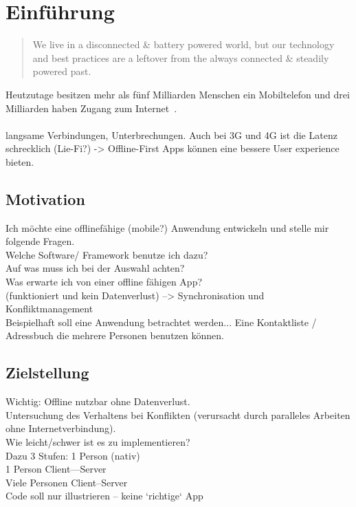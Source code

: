 \chapter{\label{chap:einleitung}Einführung}
\begin{quote}
  We live in a disconnected \& battery powered world, but our technology and best practices are a leftover from the always connected \& steadily powered past.
  \cite{offlinefirst}
\end{quote}

Heutzutage besitzen mehr als fünf Milliarden Menschen ein Mobiltelefon und drei Milliarden haben Zugang zum Internet~\cite{dev-report}.\\\\
langsame Verbindungen, Unterbrechungen. Auch bei 3G und 4G ist die Latenz schrecklich (Lie-Fi?) -> Offline-First Apps können eine bessere User experience bieten.

\section{Motivation}
Ich möchte eine offlinefähige (mobile?) Anwendung entwickeln und stelle mir folgende Fragen. \\
Welche Software/ Framework benutze ich dazu?\\
Auf was muss ich bei der Auswahl achten?\\
Was erwarte ich von einer offline fähigen App?\\
(funktioniert und kein Datenverlust) --> Synchronisation und Konfliktmanagement\\
Beispielhaft soll eine Anwendung betrachtet werden... Eine Kontaktliste / Adressbuch die mehrere Personen benutzen können.\\
\section{Zielstellung}
Wichtig: Offline nutzbar ohne Datenverlust.\\
Untersuchung des Verhaltens bei  Konflikten (verursacht durch paralleles Arbeiten ohne Internetverbindung).\\
Wie leicht/schwer ist es zu implementieren?
\\
Dazu 3 Stufen: 1 Person (nativ)\\
1 Person Client---Server\\
Viele Personen Client--Server\\
Code soll nur illustrieren -- keine `richtige` App
